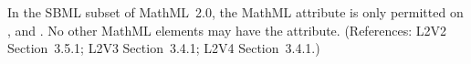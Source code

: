 In the SBML subset of MathML~2.0, the MathML attribute
 is only permitted on ,
 and .  No other
MathML elements may have the  attribute.
(References: L2V2 Section~3.5.1; L2V3 Section~3.4.1; L2V4 Section~3.4.1.)
